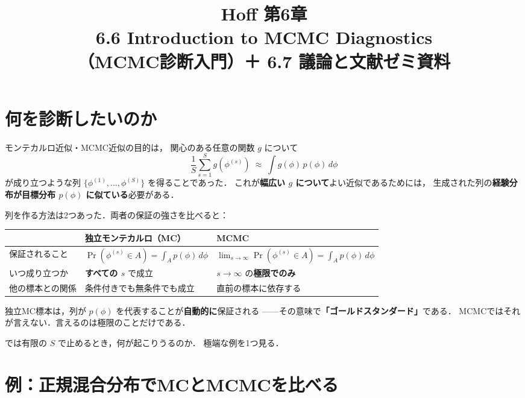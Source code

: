 \documentclass[lualatex,ja=standard,a4paper,12pt]{bxjsarticle}
\title{{\large Hoff 第6章} \\[6pt]
       \textbf{6.6\; Introduction to MCMC Diagnostics} \\[4pt]
       {\normalsize （MCMC診断入門）＋ 6.7 議論と文献\quad ゼミ資料}}
\author{}
\date{}
\begin{document}
\maketitle
\thispagestyle{empty}

\section{何を診断したいのか}

モンテカルロ近似・MCMC近似の目的は，
関心のある任意の関数 $g$ について
\[
  \frac{1}{S}\sum_{s=1}^{S} g(\phi^{(s)})
  \;\approx\; \int g(\phi)\, p(\phi)\, d\phi
\]
が成り立つような列 $\{\phi^{(1)}, \ldots, \phi^{(S)}\}$ を得ることであった．
これが\textbf{幅広い $g$ について}よい近似であるためには，
生成された列の\textbf{経験分布が目標分布 $p(\phi)$ に似ている}必要がある．

\medskip
列を作る方法は2つあった．両者の保証の強さを比べると：

\begin{center}
\renewcommand{\arraystretch}{1.8}
\begin{tabular}{lll}
\toprule
 & 独立モンテカルロ（MC） & MCMC \\
\midrule
保証されること
  & $\Pr(\phi^{(s)} \in A) = \int_A p(\phi)\,d\phi$
  & $\displaystyle\lim_{s\to\infty}\Pr(\phi^{(s)} \in A) = \int_A p(\phi)\,d\phi$ \\
いつ成り立つか
  & \textbf{すべての $s$} で成立
  & $s \to \infty$ の\textbf{極限でのみ} \\
他の標本との関係
  & 条件付きでも無条件でも成立
  & 直前の標本に依存する \\
\bottomrule
\end{tabular}
\end{center}

\medskip
\noindent 独立MC標本は，列が $p(\phi)$ を代表することが\textbf{自動的に}保証される
——その意味で\textbf{「ゴールドスタンダード」}である．
MCMCではそれが言えない．言えるのは極限のことだけである．

\medskip
では有限の $S$ で止めるとき，何が起こりうるのか．
極端な例を1つ見る．

\section{例：正規混合分布でMCとMCMCを比べる}
\end{document}
